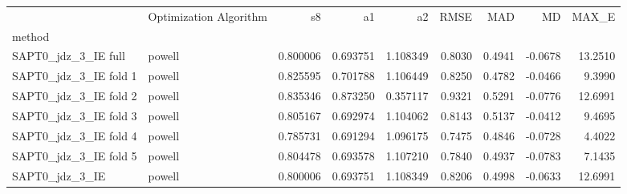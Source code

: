 \begin{tabular}{llrrrrrrr}
 & Optimization Algorithm & s8 & a1 & a2 & RMSE & MAD & MD & MAX_E \\
method &  &  &  &  &  &  &  &  \\
SAPT0_jdz_3_IE full & powell & 0.800006 & 0.693751 & 1.108349 & 0.8030 & 0.4941 & -0.0678 & 13.2510 \\
SAPT0_jdz_3_IE fold 1 & powell & 0.825595 & 0.701788 & 1.106449 & 0.8250 & 0.4782 & -0.0466 & 9.3990 \\
SAPT0_jdz_3_IE fold 2 & powell & 0.835346 & 0.873250 & 0.357117 & 0.9321 & 0.5291 & -0.0776 & 12.6991 \\
SAPT0_jdz_3_IE fold 3 & powell & 0.805167 & 0.692974 & 1.104062 & 0.8143 & 0.5137 & -0.0412 & 9.4695 \\
SAPT0_jdz_3_IE fold 4 & powell & 0.785731 & 0.691294 & 1.096175 & 0.7475 & 0.4846 & -0.0728 & 4.4022 \\
SAPT0_jdz_3_IE fold 5 & powell & 0.804478 & 0.693578 & 1.107210 & 0.7840 & 0.4937 & -0.0783 & 7.1435 \\
SAPT0_jdz_3_IE & powell & 0.800006 & 0.693751 & 1.108349 & 0.8206 & 0.4998 & -0.0633 & 12.6991 \\
\end{tabular}
